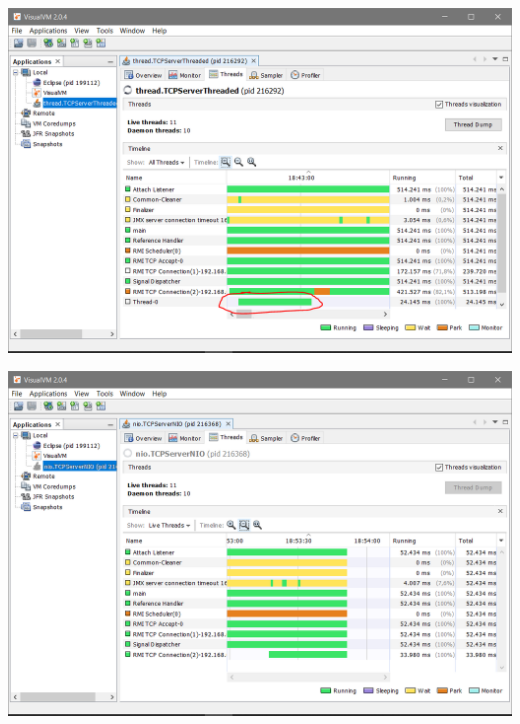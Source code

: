 \vspace{2em}
\begin{minipage}{\textwidth}
    \hspace{-1em}
    \centering
    \includegraphics[scale=.4]{prints/visualvm-threaded.PNG}
    \label{threadspng}
    \hspace{1em}
\end{minipage}
\vspace{0.5em}

\vspace{2em}
\begin{minipage}{\textwidth}
    \hspace{-1em}
    \centering
    \includegraphics[scale=.4]{prints/visualvm-nio.PNG}
    \label{threadspng}
    \hspace{1em}
\end{minipage}
\vspace{0.5em}


